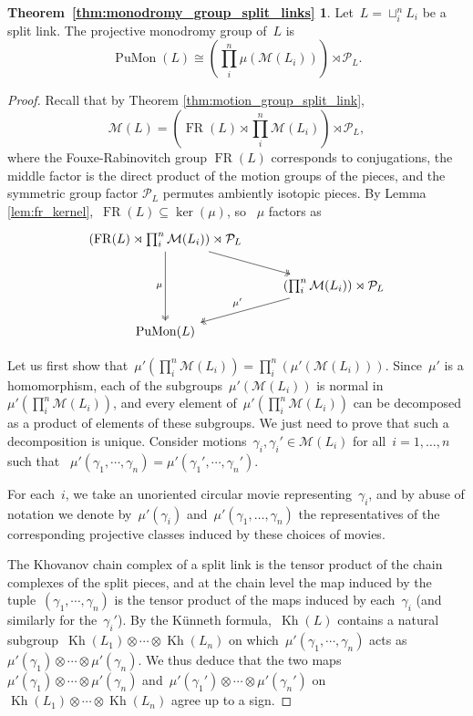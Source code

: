 \documentclass{amsart}
\theoremstyle{definition}
\theoremstyle{definition}
\theoremstyle{definition}
\theoremstyle{definition}
\newtheorem*{thm:monodromy_split}{Theorem~\ref{thm:monodromy_group_split_links}}
\newcommand{\calM}{\mathcal{M}}
\newcommand{\calP}{\mathcal{P}} %
\DeclareMathOperator{\PuMon}{PuMon}
\DeclareMathOperator{\Kh}{Kh}
\DeclareMathOperator{\FR}{FR}
\begin{document}
\begin{thm:monodromy_split}
   Let~$L=\sqcup_i^nL_i$ be a split link. The projective monodromy group of~$L$ is~$$ \PuMon(L)\cong \left(\prod _i^n \mu(\calM(L_i))\right)\rtimes \calP_L.$$
\end{thm:monodromy_split}
\begin{proof}
    Recall that by Theorem \ref{thm:motion_group_split_link},~$$
    \calM(L) = \left(\FR(L) \rtimes \prod_i^n \calM(L_i)\right) \rtimes \calP_L,$$ 
    where the Fouxe-Rabinovitch group $\FR(L)$ corresponds to conjugations, the middle factor is the direct product of the motion groups of the pieces, and the symmetric group factor $\calP_L$ permutes ambiently isotopic pieces. By Lemma \ref{lem:fr_kernel},~$\FR(L) \subseteq \ker(\mu)$, so ~$\mu$ factors as
    \[\begin{tikzcd}
	{\left(\FR(L) \rtimes \prod_i^n \calM(L_i)\right) \rtimes \calP_L} & \\
	& { \left(\prod_i^n \calM(L_i)\right) \rtimes \calP_L} \\
	{\PuMon(L)}
	\arrow[two heads, from=1-1, to=2-2]
	\arrow["\mu"', two heads, from=1-1, to=3-1]
	\arrow["{\mu'}"', two heads, from=2-2, to=3-1]
\end{tikzcd}\]

Let us first show that~$\mu'(\prod_i^n\calM(L_i))= \prod_i^n(\mu'(\calM (L_i)))$.  Since~$\mu'$ is a homomorphism, each of the subgroups~$\mu'(\calM (L_i))$ is normal in~$\mu'(\prod_i^n\calM(L_i))$, and every element of~$\mu'(\prod_i^n\calM(L_i))$ can be decomposed as a product of elements of these subgroups. We just need to prove that such a decomposition is unique. Consider motions~$\gamma_i, \gamma_i ' \in \calM(L_i)$ for all~$i=1,\dots, n$ such that ~$\mu'(\gamma_1,\cdots,\gamma_n) = \mu'(\gamma_1',\cdots,\gamma_n')$. 

For each~$i$, we take an unoriented circular movie representing~$\gamma_i$, and by abuse of notation we denote by~$\mu'(\gamma_i)$ and~$\mu'(\gamma_1, \dots, \gamma_n)$ the representatives of the corresponding projective classes induced by these choices of movies. 

The Khovanov chain complex of a split link is the tensor product of the chain complexes of the split pieces, and at the chain level the map induced by the tuple~$(\gamma_1,\cdots,\gamma_n)$ is the tensor product of the maps induced by each~$\gamma_i$ (and similarly for the~$\gamma_i'$). By the K\"unneth formula,~$\Kh(L)$ contains a natural subgroup~$\Kh(L_1)\otimes\cdots\otimes \Kh(L_n)$ on which~$\mu'(\gamma_1,\cdots,\gamma_n)$ acts as~$\mu'(\gamma_1)\otimes\cdots\otimes\mu'(\gamma_n)$. We thus deduce that the two maps~$\mu'(\gamma_1)\otimes\cdots\otimes\mu'(\gamma_n)$ and~$\mu'(\gamma_1')\otimes\cdots\otimes\mu'(\gamma_n')$ on~$\Kh(L_1)\otimes\cdots\otimes \Kh(L_n)$ agree up to a sign. 


\end{proof}
\end{document}
